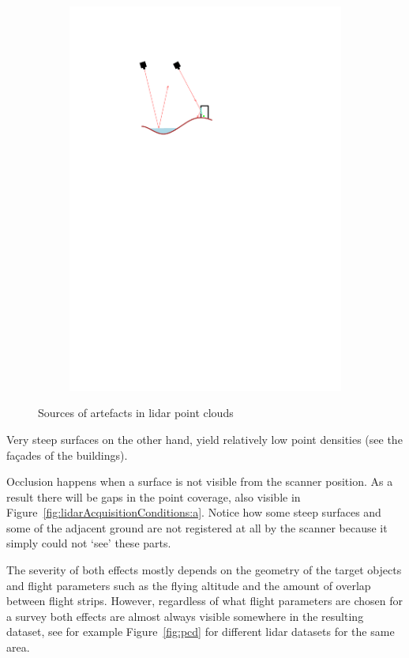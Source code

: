 \begin{figure}
\begin{subfigure}{0.3\linewidth}
		\includegraphics[width=\textwidth,page=1]{figs/lidarAcq.pdf}
		\label{fig:lidarAcquisitionConditions:b}
	\end{subfigure}
	\caption{Sources of artefacts in lidar point clouds}
	\label{fig:lidarAcquisitionConditions}
\end{figure}
Very steep surfaces on the other hand, yield relatively low point densities (see the façades of the buildings). 

Occlusion happens when a surface is not visible from the scanner position. 
As a result there will be gaps in the point coverage, also visible in Figure~\ref{fig:lidarAcquisitionConditions:a}. 
Notice how some steep surfaces and some of the adjacent ground are not registered at all by the scanner because it simply could not `see' these parts.

The severity of both effects mostly depends on the geometry of the target objects and flight parameters such as the flying altitude and the amount of overlap between flight strips.
However, regardless of what flight parameters are chosen for a survey both effects are almost always visible somewhere in the resulting dataset, see for example Figure~\ref{fig:pcd} for different lidar datasets for the same area.

